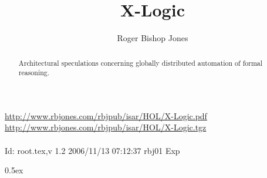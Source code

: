 \documentclass[11pt,a4paper]{article}
\begin{document}
\title{X-Logic}
\author{Roger Bishop Jones}
\maketitle

\begin{abstract}
Architectural speculations concerning globally distributed automation of formal reasoning. 
\end{abstract}

\vfill

\begin{centering}
{\tiny
\href{http://www.rbjones.com/rbjpub/isar/HOL/X-Logic.pdf}{http://www.rbjones.com/rbjpub/isar/HOL/X-Logic.pdf}\\
\href{http://www.rbjones.com/rbjpub/isar/HOL/X-Logic.tgz}{http://www.rbjones.com/rbjpub/isar/HOL/X-Logic.tgz}\\
\ \\
$ $Id: root.tex,v 1.2 2006/11/13 07:12:37 rbj01 Exp $ $\\
}%
\end{centering}

\newpage
\tableofcontents

\parindent 0pt\parskip 0.5ex




%
%
\end{document}

